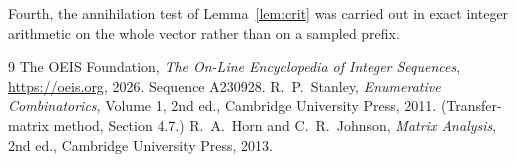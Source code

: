 \documentclass[11pt,a4paper]{article}
\theoremstyle{plain}
\theoremstyle{definition}
\begin{document}
Fourth, the annihilation test of Lemma~\ref{lem:crit} was carried out in exact integer
arithmetic on the whole vector rather than on a sampled prefix.

\begin{thebibliography}{9}
 The OEIS Foundation, \emph{The On-Line Encyclopedia of Integer
Sequences}, \url{https://oeis.org}, 2026. Sequence A230928.
 R.~P.~Stanley, \emph{Enumerative Combinatorics}, Volume 1, 2nd ed.,
Cambridge University Press, 2011. (Transfer-matrix method, Section 4.7.)
 R.~A.~Horn and C.~R.~Johnson, \emph{Matrix Analysis}, 2nd ed., Cambridge
University Press, 2013.
\end{thebibliography}
\end{document}
